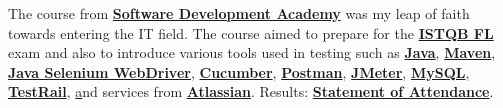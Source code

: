 \documentclass[theme]{cv_einstein}
\begin{document}
\begin{paracol}{2}
\begin{rightcolumn}
            {The course from \href{https://sdacademy.dev/}{\textbf{Software Development Academy}} was my leap of faith towards entering the IT field. The course aimed to prepare for the \href{https://www.istqb.org/certifications/certified-tester-foundation-level}{\textbf{ISTQB FL}} exam and also to introduce various tools used in testing such as \href{https://www.java.com/}{\textbf{Java}}, \href{https://maven.apache.org/what-is-maven.html}{\textbf{Maven}}, \href{https://www.selenium.dev/}{\textbf{Java Selenium WebDriver}}, \href{https://cucumber.io/}{\textbf{Cucumber}}, \href{https://www.postman.com/}{\textbf{Postman}}, \href{https://jmeter.apache.org/}{\textbf{JMeter}}, \href{https://www.mysql.com/}{\textbf{MySQL}}, \href{https://www.testrail.com/}{\textbf{TestRail}}, \href{https://sdacademy.dev/} and services from \href{https://www.atlassian.com/}{\textbf{Atlassian}}.}
            {Results: \href{https://drive.google.com/file/d/1KNqjtyxgEgl3oX9MsnACIOpoZYgP0HpX/view}{\textbf{Statement of Attendance}}.}\\
            \vspace{\itemspace}\\
        \end{rightcolumn}


\end{paracol}
\end{document}
